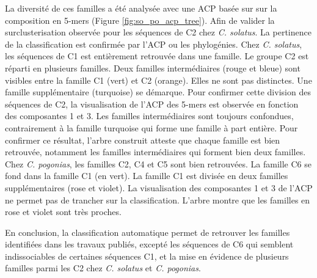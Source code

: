 \documentclass[12pt,a4paper]{article}
\begin{document}
			La diversité de ces familles a été analysée avec une ACP basée sur sur la composition en 5-mers (Figure \ref{fig:so_po_acp_tree}). Afin de valider la surclusterisation observée pour les séquences de C2 chez \textit{C. solatus}. La pertinence de la classification est confirmée par l'ACP ou les phylogénies. Chez \textit{C. solatus}, les séquences de C1 est entièrement retrouvée dans une famille. Le groupe C2 est réparti en plusieurs familles. Deux familles intermédiaires (rouge et bleue) sont visibles entre la famille C1 (vert)  et C2 (orange). Elles ne sont pas distinctes.  Une famille supplémentaire (turquoise) se démarque. Pour confirmer cette division des séquences de C2, la visualisation de l'ACP des 5-mers est observée en fonction des composantes 1 et 3. Les familles intermédiaires sont toujours confondues, contrairement à la famille turquoise qui forme une famille à part entière. Pour confirmer ce résultat, l'arbre construit atteste que chaque famille est bien retrouvée, notamment les familles intermédiaires qui forment bien deux familles. Chez \textit{C. pogonias}, les familles C2, C4 et C5 sont bien retrouvées. La famille C6 se fond dans la famille C1 (en vert). La famille C1 est divisée en deux familles supplémentaires (rose et violet). La visualisation des composantes 1 et 3 de l'ACP ne permet pas de trancher sur la classification. L'arbre montre que les familles en rose et violet sont très proches.  
			
			En conclusion, la classification automatique permet de retrouver les familles identifiées dans les travaux publiés, excepté les séquences de C6 qui semblent indissociables de certaines séquences C1, et la mise en évidence de plusieurs familles parmi les C2 chez \textit{C. solatus} et \textit{C. pogonias}.
			 
\end{document}
